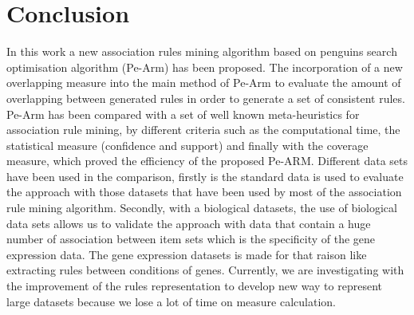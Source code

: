 \documentclass[preprint,12pt]{elsarticle}
\begin{document}
 \section{Conclusion}
In this work a new association rules mining algorithm based on penguins search optimisation 
algorithm (Pe-Arm) has been proposed. The incorporation of a new overlapping measure  into the main method of Pe-Arm to evaluate the amount of overlapping between generated rules in order to generate a set of consistent rules. 
Pe-Arm has been compared with a set of well known meta-heuristics for association rule mining, by different criteria such as the computational time, the statistical measure (confidence and support) and finally with the coverage measure, which proved the efficiency of the proposed Pe-ARM. Different data sets have been used in the comparison, firstly is the standard data is used to evaluate the approach with those datasets that have been used by most of the association rule mining algorithm. Secondly, with a biological datasets, the use of biological data sets allows us to validate the approach with data that contain a huge number of association between item sets which is the specificity of the gene expression data. The gene expression datasets is made for that raison like extracting rules between conditions of genes. Currently, we are investigating with the improvement of the rules representation to develop new way to represent large datasets because we lose a lot of time on measure calculation.
\end{document}
